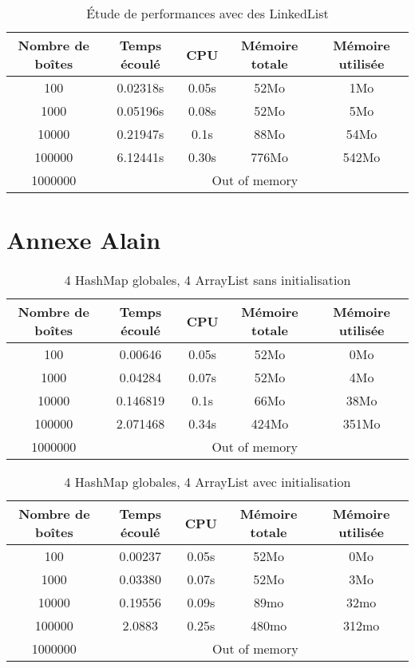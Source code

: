 \begin{table}[htbp]
  \centering
\begin{tabular}{|c|c|c|c|c|}
\hline
Nombre de boîtes & Temps écoulé & CPU & Mémoire totale & Mémoire utilisée\\
\hline
100 & 0.02318s & 0.05s & 52Mo & 1Mo\\
\hline
1000 & 0.05196s & 0.08s & 52Mo & 5Mo\\
\hline
10000 & 0.21947s & 0.1s & 88Mo & 54Mo\\
\hline
100000 & 6.12441s & 0.30s & 776Mo & 542Mo\\
\hline
1000000 & \multicolumn{4}{|c|}{Out of memory}\\
\hline
\end{tabular}
\caption{Étude de performances avec des LinkedList}
\label{tab:linkedlist}
\end{table}

\section{Annexe Alain}
\begin{table}[h]
  \centering
\begin{tabular}{|c|c|c|c|c|}
\hline
Nombre de boîtes & Temps écoulé & CPU & Mémoire totale & Mémoire utilisée\\
\hline
100 & 0.00646& 0.05s & 52Mo & 0Mo\\
\hline
1000 & 0.04284 & 0.07s & 52Mo & 4Mo\\
\hline
10000 & 0.146819 & 0.1s & 66Mo & 38Mo\\
\hline
100000 &2.071468 & 0.34s & 424Mo & 351Mo\\
\hline
1000000 & \multicolumn{4}{|c|}{Out of memory}\\
\hline
\end{tabular}
\caption{4 HashMap globales, 4 ArrayList sans initialisation}
\end{table}


\begin{table}[h]
  \centering
\begin{tabular}{|c|c|c|c|c|}
\hline
Nombre de boîtes & Temps écoulé & CPU & Mémoire totale & Mémoire utilisée\\
\hline
100 & 0.00237& 0.05s & 52Mo & 0Mo\\
\hline
1000 & 0.03380 & 0.07s & 52Mo & 3Mo\\
\hline
10000 & 0.19556 & 0.09s & 89mo & 32mo\\
\hline
100000 & 2.0883 & 0.25s & 480mo & 312mo\\
\hline
1000000 & \multicolumn{4}{|c|}{Out of memory}\\
\hline
\end{tabular}
\caption{4 HashMap globales, 4 ArrayList avec  initialisation}
\end{table}













